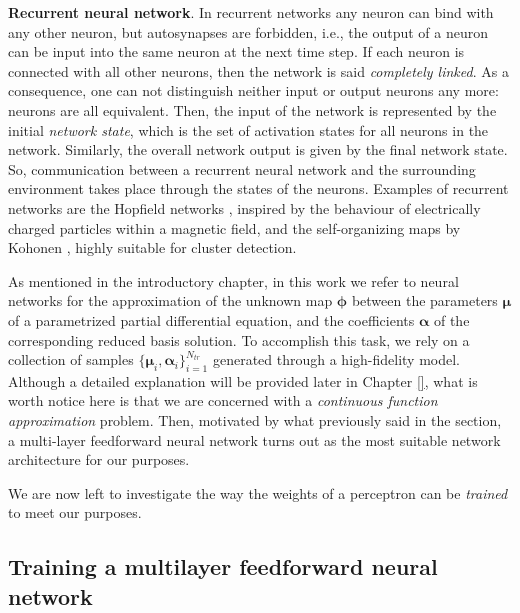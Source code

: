 \documentclass[12pt, a4paper, twoside, openright]{report}
\numberwithin{equation}{chapter}
\theoremstyle{theorem}
\theoremstyle{definition}
\theoremstyle{remark}
\theoremstyle{proposition}
\numberwithin{figure}{chapter}
\begin{document}
		\noindent \textbf{Recurrent neural network}. In recurrent networks any neuron can bind with any other neuron, but autosynapses are forbidden, i.e., the output of a neuron can be input into the same neuron at the next time step. If each neuron is connected with all other neurons, then the network is said \emph{completely linked}. As a consequence, one can not distinguish neither input or output neurons any more: neurons are all equivalent. Then, the input of the network is represented by the initial \emph{network state}, which is the set of activation states for all neurons in the network. Similarly, the overall network output is given by the final network state. So, communication between a recurrent neural network and the surrounding environment takes place through the states of the neurons. Examples of recurrent networks are the Hopfield networks \cite{Hop82}, inspired by the behaviour of electrically charged particles within a magnetic field, and the self-organizing maps by Kohonen \cite{Koh98}, highly suitable for cluster detection.
		
		\vspace*{0.3cm}
		
		As mentioned in the introductory chapter, in this work we refer to neural networks for the approximation of the unknown map $\boldsymbol{\phi}$ between the parameters $\boldsymbol{\mu}$ of a parametrized partial differential equation, and the coefficients $\boldsymbol{\alpha}$ of the corresponding reduced basis solution. To accomplish this task, we rely on a collection of samples $\big\lbrace \boldsymbol{\mu}_i, \boldsymbol{\alpha}_i \big\rbrace_{i = 1}^{N_{tr}}$ generated through a high-fidelity model. Although a detailed explanation will be provided later in Chapter \ref{}, what is worth notice here is that we are concerned with a \emph{continuous function approximation} problem. Then, motivated by what previously said in the section, a multi-layer feedforward neural network turns out as the most suitable network architecture for our purposes. 
		
		We are now left to investigate the way the weights of a perceptron can be \emph{trained} to meet our purposes.
		
	\vspace*{0.3cm}
		
	\subsection{Training a multilayer feedforward neural network}
	\label{section:Training a multilayer feedforard neural network}
	
\end{document}
